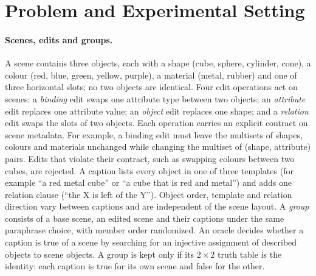 \section{Problem and Experimental Setting}
\label{sec:setting}

\paragraph{Scenes, edits and groups.}
A scene contains three objects, each with a shape (cube, sphere, cylinder, cone), a colour (red,
blue, green, yellow, purple), a material (metal, rubber) and one of three horizontal slots; no two
objects are identical. Four edit operations act on scenes: a \emph{binding} edit swaps one
attribute type between two objects; an \emph{attribute} edit replaces one attribute value; an
\emph{object} edit replaces one shape; and a \emph{relation} edit swaps the slots of two objects.
Each operation carries an explicit contract on scene metadata. For example, a binding edit must
leave the multisets of shapes, colours and materials unchanged while changing the multiset of
(shape, attribute) pairs. Edits that violate their contract, such as swapping colours between two
cubes, are rejected. A caption lists every object in one of three templates (for example
``a red metal cube'' or ``a cube that is red and metal'') and adds one relation clause
(``the X is left of the Y''). Object order, template and relation direction vary between captions
and are independent of the scene layout. A \emph{group} consists of a base scene, an edited scene
and their captions under the same paraphrase choice, with member order randomized. An oracle
decides whether a caption is true of a scene by searching for an injective assignment of described
objects to scene objects. A group is kept only if its $2{\times}2$ truth table is the identity:
each caption is true for its own scene and false for the other.


